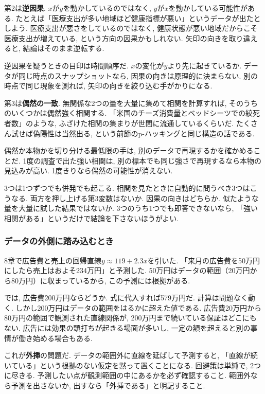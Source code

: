 第2は\textbf{逆因果}.
$x$が$y$を動かしているのではなく, $y$が$x$を動かしている可能性がある.
たとえば「医療支出が多い地域ほど健康指標が悪い」というデータが出たとしよう.
医療支出が悪さをしているのではなく, 健康状態が悪い地域だからこそ医療支出が増えている, という方向の因果かもしれない.
矢印の向きを取り違えると, 結論はそのまま逆転する.

逆因果を疑うときの目印は時間順序だ.
$x$の変化が$y$より先に起きているか. データが同じ時点のスナップショットなら, 因果の向きは原理的に決まらない.
別の時点で同じ現象を測れば, 矢印の向きを絞り込む手がかりになる.

第3は\textbf{偶然の一致}.
無関係な2つの量を大量に集めて相関を計算すれば, そのうちのいくつかは偶然強く相関する.
「米国のチーズ消費量とベッドシーツでの絞死者数」のような, ふざけた相関の集まりが世間に流通しているくらいだ.
たくさん試せば偽陽性は当然出る, という前節のp-ハッキングと同じ構造の話である.

偶然か本物かを切り分ける最低限の手は, 別のデータで再現するかを確かめることだ.
1度の調査で出た強い相関は, 別の標本でも同じ強さで再現するなら本物の見込みが高い. 1度きりなら偶然の可能性が消えない.

3つは1つずつでも併発でも起こる. 相関を見たときに自動的に問うべき3つはこうなる.
両方を押し上げる第3変数はないか. 因果の向きはどちらか. 似たような量を大量に試した結果ではないか.
3つのうち1つでも即答できないなら, 「強い相関がある」というだけで結論を下さないほうがよい.

\subsubsection*{データの外側に踏み込むとき}

8章で広告費と売上の回帰直線$y \approx 119 + 2.3x$を引いた.
「来月の広告費を50万円にしたら売上はおよそ234万円」と予測した.
50万円はデータの範囲（20万円から80万円）に収まっているから, この予測には根拠がある.

では, 広告費200万円ならどうか.
式に代入すれば579万円だ. 計算は問題なく動く.
しかし200万円はデータの範囲をはるかに超えた値である.
広告費20万円から80万円の範囲で観測された直線関係が, 200万円まで続いている保証はどこにもない.
広告には効果の頭打ちが起きる場面が多いし, 一定の額を超えると別の事情が働き始める場合もある.

これが\textbf{外挿}の問題だ.
データの範囲外に直線を延ばして予測すると, 「直線が続いている」という根拠のない仮定を黙って置くことになる.
回避策は単純で, 2つに尽きる. 予測したい点が観測範囲の中にあるかを必ず確認すること. 範囲外なら予測を出さないか, 出すなら「外挿である」と明記すること.

